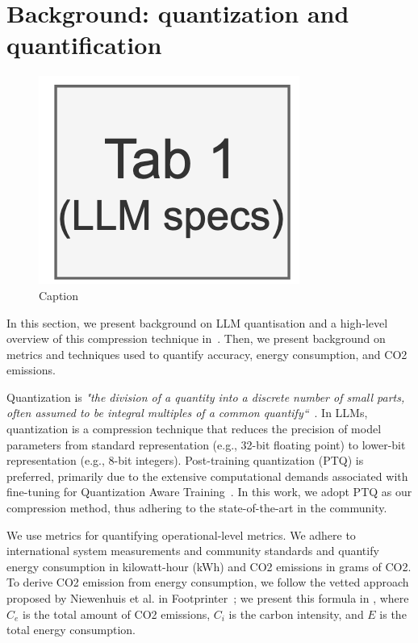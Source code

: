 \section{Background: quantization and quantification} \label{sec:background}

\begin{figure}
    \centering
    \includegraphics[width=0.75\linewidth]{reportTemplate/figures/f2.png}
    \caption{Caption}
    \label{fig:background}
\end{figure}

In this section, we present background on LLM quantisation and a high-level overview of this compression technique in~. Then, we present background on metrics and techniques used to quantify accuracy, energy consumption, and CO2 emissions. 

Quantization is \textit{"the division of a quantity into a discrete number of small parts, often assumed to be integral multiples of a common quantify``}~\cite{DBLP:journals/corr/abs-2411-0253}. In LLMs, quantization is a compression technique that reduces the precision of model parameters from standard representation (e.g., 32-bit floating point) to lower-bit representation (e.g., 8-bit integers). Post-training quantization (PTQ) is preferred, primarily due to
the extensive computational demands associated with fine-tuning for Quantization Aware Training~\cite{zhang2023dual, DBLP:conf/icml/NagelABLB20, DBLP:journals/corr/abs-2006-10518}. In this work, we adopt PTQ as our compression method, thus adhering to the state-of-the-art in the community.

We use metrics for quantifying operational-level metrics. We adhere to international system measurements and community standards and quantify energy consumption in kilowatt-hour (kWh) and CO2 emissions in grams of CO2. To derive CO2 emission from energy consumption, we follow the vetted approach proposed by Niewenhuis et al. in Footprinter~\cite{DBLP:conf/wosp/NiewenhuisTIM24}; we present this formula in , where $C_e$ is the total amount of CO2 emissions, $C_i$ is the carbon intensity, and $E$ is the total energy consumption.

